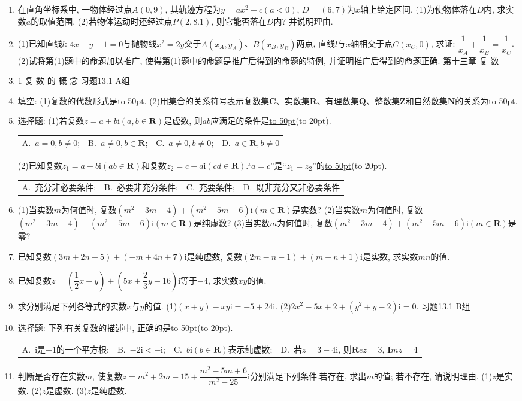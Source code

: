 \documentclass[10pt,a4paper]{article}
\newcommand{\blank}[1]{\underline{\hbox to #1pt{}}}
\newcommand{\bracket}[1]{(\hbox to #1pt{})}
\newcommand{\fourch}[4]{\par\begin{tabular}{p{.23\textwidth}p{.23\textwidth}p{.23\textwidth}p{.23\textwidth}}
A.~#1 &B.~#2& C.~#3& D.~#4
\end{tabular}}
\begin{document}
\begin{enumerate}[1.]
\item 在直角坐标系中, 一物体经过点$A(0,9)$, 其轨迹方程为$y=ax^2+c(a<0)$, $D=(6,7)$为$x$轴上给定区间.
(1)为使物体落在$D$内, 求实数$a$的取值范围.
(2)若物体运动时还经过点$P(2,8.1)$, 则它能否落在$D$内? 并说明理由.
\item (1)已知直线$l$: $4x-y-1=0$与抛物线$x^2=2y$交于$A(x_A,y_A)$、$B(x_B,y_B)$两点, 直线$l$与$x$轴相交于点$C(x_C,0)$, 求证: $\dfrac 1{x_A}+\dfrac 1{x_B}=\dfrac 1{x_C}$.
(2)试将第(1)题中的命题加以推广, 使得第(1)题中的命题是推广后得到的命题的特例, 并证明推广后得到的命题正确.
第十三章  复   数
\item 1  复 数 的 概 念
习题13.1  A组
\item 填空:
(1)复数的代数形式是\blank{50}.
(2)用集合的关系符号表示复数集$\mathbf{C}$、实数集$\mathbf{R}$、有理数集$\mathbf{Q}$、整数集$\mathbf{Z}$和自然数集$\mathbf{N}$的关系为\blank{50}.
\item 选择题:
(1)若复数$z=a+b\mathrm{i}(a,b\in \mathbf{R})$是虚数, 则$ab$应满足的条件是\blank{50}\bracket{20}.
\fourch{$a=0,b\ne 0$;}{$a\ne 0,b\in \mathbf{R}$;}{$a\ne 0,b\ne 0$;}{$a\in \mathbf{R},b\ne 0$}
(2)已知复数$z_1=a+b\mathrm{i}(ab\in \mathbf{R})$和复数$z_2=c+d\mathrm{i}(cd\in \mathbf{R})$.``$a=c$''是``$z_1=z_2$''的\blank{50}\bracket{20}.
\fourch{充分非必要条件;}{必要非充分条件;}{充要条件;}{既非充分又非必要条件}
\item (1)当实数$m$为何值时, 复数$(m^2-3m-4)+(m^2-5m-6)\mathrm{i}(m\in \mathbf{R})$是实数?
(2)当实数$m$为何值时, 复数$(m^2-3m-4)+(m^2-5m-6)\mathrm{i}(m\in \mathbf{R})$是纯虚数?
(3)当实数$m$为何值时, 复数$(m^2-3m-4)+(m^2-5m-6)\mathrm{i}(m\in \mathbf{R})$是零?
\item 已知复数$(3m+2n-5)+(-m+4n+7)\mathrm{i}$是纯虚数, 复数$(2m-n-1)+(m+n+1)\mathrm{i}$是实数, 求实数$mn$的值.
\item 已知复数$z=(\dfrac 12x+y)+(5x+\dfrac 23y-16)\mathrm{i}$等于$-4$, 求实数$xy$的值.
\item 求分别满足下列各等式的实数$x$与$y$的值.
(1)$(x+y)-xy\mathrm{i}=-5+24\mathrm{i}$.
(2)$2x^2-5x+2+(y^2+y-2)\mathrm{i}=0$.
习题13.1  B组
\item 选择题:
下列有关复数的描述中, 正确的是\blank{50}\bracket{20}.
\fourch{$\mathrm{i}$是$-1$的一个平方根;}{$-2\mathrm{i}<-\mathrm{i}$;}{$b\mathrm{i}(b\in \mathbf{R})$表示纯虚数;}{若$z=3-4\mathrm{i}$, 则$\mathbf Rez=3$, $\mathbf Imz=4$}
\item 判断是否存在实数$m$, 使复数$z=m^2+2m-15+\dfrac{{m^2}-5m+6}{{m^2}-25}\mathrm{i}$分别满足下列条件.若存在, 求出$m$的值; 若不存在, 请说明理由.
(1)$z$是实数.
(2)$z$是虚数.
(3)$z$是纯虚数.

\end{enumerate}
\end{document}
